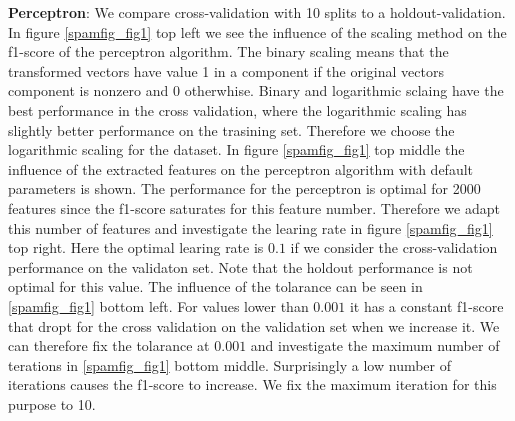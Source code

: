 \documentclass[11pt]{article}
\begin{document}
\textbf{Perceptron}: We compare cross-validation with 10 splits to a holdout-validation. In figure \ref{spamfig_fig1} top left we see the influence of the scaling method on the f1-score of the perceptron algorithm. The binary scaling means that the transformed vectors have value 1 in a component if the original vectors component is nonzero and 0 otherwhise. Binary and logarithmic sclaing have the best performance in the cross validation, where the logarithmic scaling has slightly better performance on the trasining set. Therefore we choose the logarithmic scaling for the dataset. In figure \ref{spamfig_fig1} top middle the influence of the extracted features on the perceptron algorithm with default parameters is shown. The performance for the perceptron is optimal for 2000 features since the f1-score saturates for this feature number. Therefore we adapt this number of features and investigate the learing rate in figure \ref{spamfig_fig1} top right. Here the optimal learing rate is $0.1$ if we consider the cross-validation performance on the validaton set. Note that the holdout performance is not optimal for this value. The influence of the tolarance can be seen in \ref{spamfig_fig1} bottom left. For values lower than $0.001$ it has a constant f1-score that dropt for the cross validation on the validation set when we increase it. We can therefore fix the tolarance at $0.001$ and investigate the maximum number of terations in \ref{spamfig_fig1} bottom middle. Surprisingly a low number of iterations causes the f1-score to increase. We fix the maximum iteration for this purpose to 10.
\end{document}
